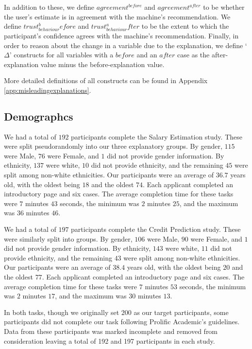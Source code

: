 In addition to these, we define $agreement^{before}$ and $agreement^{after}$ to be whether the user's estimate is in agreement with the machine's recommendation. We define $trust_{behaviour}^before$ and $trust_{behaviour}^after$ to be the extent to which the participant's confidence agrees with the machine's recommendation. Finally, in order to reason about the change in a variable due to the explanation, we define `$\Delta$' constructs for all variables with a $before$ and an $after$ case as the after-explanation value minus the before-explanation value.

More detailed definitions of all constructs can be found in Appendix \ref{app:misleadingexplanations}.

\subsection{Demographcs}

We had a total of $192$ participants complete the Salary Estimation study. These were split pseudorandomly into our three explanatory groups. By gender, $115$ were Male, $76$ were Female, and $1$ did not provide gender information. By ethnicity, $137$ were white, $10$ did not provide ethnicity, and the remaining $45$ were split among non-white ethnicities. Our participants were an average of $36.7$ years old, with the oldest being $18$ and the oldest $74$. Each applicant completed an introductory page and six cases. The average completion time for these tasks were $7$ minutes $43$ seconds, the minimum was $2$ minutes $25$, and the maximum was $36$ minutes $46$.

We had a total of $197$ participants complete the Credit Prediction study. These were similarly split into groups. By gender, $106$ were Male, $90$ were Female, and $1$ did not provide gender information. By ethnicity, $143$ were white, $11$ did not provide ethnicity, and the remaining $43$ were split among non-white ethnicities. Our participants were an average of $38.4$ years old, with the oldest being $20$ and the oldest $77$. Each applicant completed an introductory page and six cases. The average completion time for these tasks were $7$ minutes $53$ seconds, the minimum was $2$ minutes $17$, and the maximum was $30$ minutes $13$.

In both tasks, though we originally set $200$ as our target participants, some participants did not complete our task following Prolific Academic's guidelines. Data from these participants was marked incomplete and removed from consideration leaving a total of 192 and 197 participants in each study.

